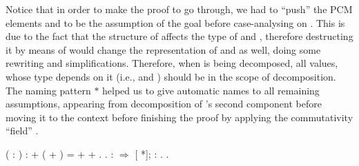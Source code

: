 Notice that in order to make the proof to go through, we had to ``push''
the PCM elements  and  to be the assumption of the goal before
case-analysing on . This is due to the fact that the structure of
 affects the type of  and , therefore destructing it by means
of  would change the representation of  and  as well,
doing some rewriting and simplifications. Therefore, when  is being
decomposed, all values, whose type depends on it (i.e.,  and )
should be in the scope of decomposition. The naming pattern $*$ helped
us to give automatic names to all remaining assumptions, appearing
from decomposition of 's second component before moving it to the
context before finishing the proof by applying the commutativity
``field'' .


\begin{coqdoccode}
\coqdocemptyline
\coqdocnoindent
{}  (   : ) :  + ( + ) =  +  + .\coqdoceol
\coqdocnoindent
{}.\coqdoceol
\coqdocnoindent
{} :    \ensuremath{\Rightarrow} [     *]; : .\coqdoceol
\coqdocnoindent
{}.\coqdoceol
\coqdocemptyline
\end{coqdoccode}


